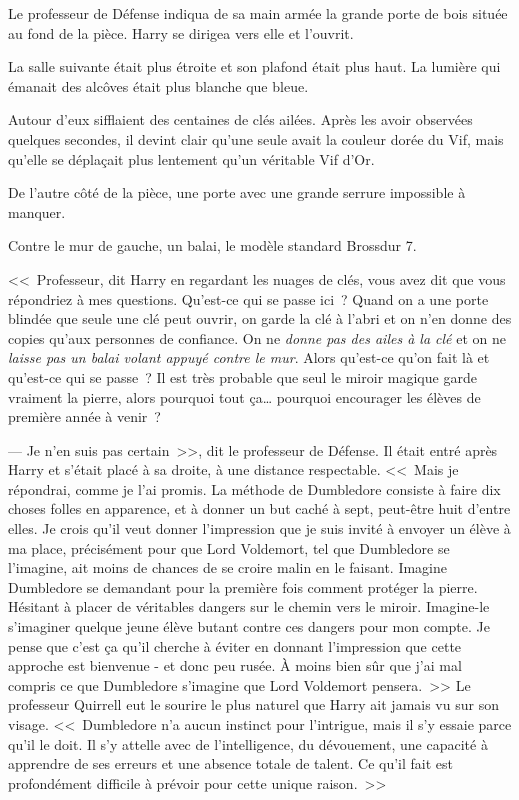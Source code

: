 Le professeur de Défense indiqua de sa main armée la grande porte de bois située au fond de la pièce. Harry se dirigea vers elle et l'ouvrit.

\later

La salle suivante était plus étroite et son plafond était plus haut. La lumière qui émanait des alcôves était plus blanche que bleue.

Autour d'eux sifflaient des centaines de clés ailées. Après les avoir observées quelques secondes, il devint clair qu'une seule avait la couleur dorée du Vif, mais qu'elle se déplaçait plus lentement qu'un véritable Vif d'Or.

De l'autre côté de la pièce, une porte avec une grande serrure impossible à manquer.

Contre le mur de gauche, un balai, le modèle standard Brossdur 7.

<<~Professeur, dit Harry en regardant les nuages de clés, vous avez dit que vous répondriez à mes questions. Qu'est-ce qui se passe ici~? Quand on a une porte blindée que seule une clé peut ouvrir, on garde la clé à l'abri et on n'en donne des copies qu'aux personnes de confiance. On ne \emph{donne pas des ailes à la clé} et on ne \emph{laisse pas un balai volant appuyé contre le mur}. Alors qu'est-ce qu'on fait là et qu'est-ce qui se passe~? Il est très probable que seul le miroir magique garde vraiment la pierre, alors pourquoi tout ça… pourquoi encourager les élèves de première année à venir~?

--- Je n'en suis pas certain~>>, dit le professeur de Défense. Il était entré après Harry et s'était placé à sa droite, à une distance respectable. <<~Mais je répondrai, comme je l'ai promis. La méthode de Dumbledore consiste à faire dix choses folles en apparence, et à donner un but caché à sept, peut-être huit d'entre elles. Je crois qu'il veut donner l'impression que je suis invité à envoyer un élève à ma place, précisément pour que Lord Voldemort, tel que Dumbledore se l'imagine, ait moins de chances de se croire malin en le faisant. Imagine Dumbledore se demandant pour la première fois comment protéger la pierre. Hésitant à placer de véritables dangers sur le chemin vers le miroir. Imagine-le s'imaginer quelque jeune élève butant contre ces dangers pour mon compte. Je pense que c'est ça qu'il cherche à éviter en donnant l'impression que cette approche est bienvenue - et donc peu rusée. À moins bien sûr que j'ai mal compris ce que Dumbledore s'imagine que Lord Voldemort pensera.~>> Le professeur Quirrell eut le sourire le plus naturel que Harry ait jamais vu sur son visage. <<~Dumbledore n'a aucun instinct pour l'intrigue, mais il s'y essaie parce qu'il le doit. Il s'y attelle avec de l'intelligence, du dévouement, une capacité à apprendre de ses erreurs et une absence totale de talent. Ce qu'il fait est profondément difficile à prévoir pour cette unique raison.~>>


